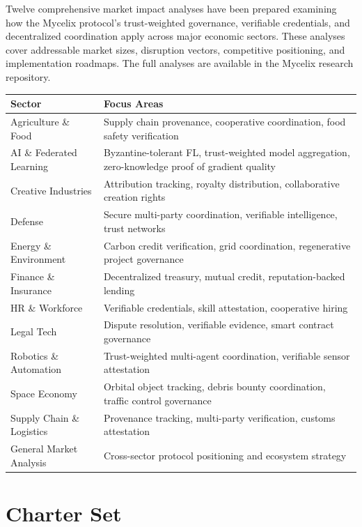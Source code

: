 \documentclass[12pt]{book}
\begin{document}
Twelve comprehensive market impact analyses have been prepared examining how
the Mycelix protocol's trust-weighted governance, verifiable credentials, and
decentralized coordination apply across major economic sectors. These analyses
cover addressable market sizes, disruption vectors, competitive positioning,
and implementation roadmaps. The full analyses are available in the Mycelix
research repository.

\begin{longtable}{lp{8cm}}
\toprule
\textbf{Sector} & \textbf{Focus Areas} \\
\midrule
\endhead
Agriculture \& Food & Supply chain provenance, cooperative coordination, food safety verification \\
AI \& Federated Learning & Byzantine-tolerant FL, trust-weighted model aggregation, zero-knowledge proof of gradient quality \\
Creative Industries & Attribution tracking, royalty distribution, collaborative creation rights \\
Defense & Secure multi-party coordination, verifiable intelligence, trust networks \\
Energy \& Environment & Carbon credit verification, grid coordination, regenerative project governance \\
Finance \& Insurance & Decentralized treasury, mutual credit, reputation-backed lending \\
HR \& Workforce & Verifiable credentials, skill attestation, cooperative hiring \\
Legal Tech & Dispute resolution, verifiable evidence, smart contract governance \\
Robotics \& Automation & Trust-weighted multi-agent coordination, verifiable sensor attestation \\
Space Economy & Orbital object tracking, debris bounty coordination, traffic control governance \\
Supply Chain \& Logistics & Provenance tracking, multi-party verification, customs attestation \\
General Market Analysis & Cross-sector protocol positioning and ecosystem strategy \\
\bottomrule
\end{longtable}


\chapter{Charter Set}
\label{app:charters}
\end{document}
